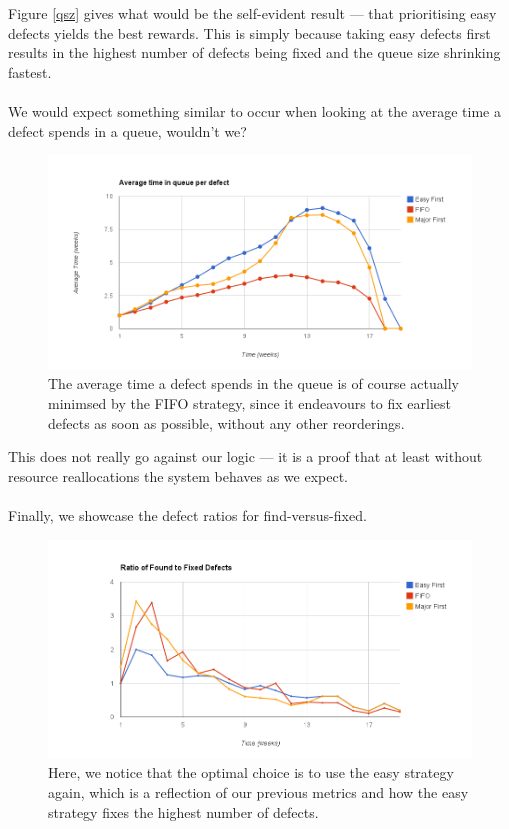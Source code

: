 Figure \ref{qsz} gives what would be the self-evident result --- that prioritising easy defects
yields the best rewards.
This is simply because taking easy defects first results in the highest number of defects being
fixed and the queue size shrinking fastest.\\
\\
We would expect something similar to occur when looking at the average time a defect spends in a
queue, wouldn't we?

\pagebreak

\begin{figure}[ht!]
	\centering
	\includegraphics[scale=0.45]{graphs/avgQueueTime.png}
	\caption{The average time a defect spends in the queue is of course actually minimsed by the FIFO
strategy, since it endeavours to fix earliest defects as soon as possible, without any other
reorderings.} 
	\label{avgqtime}
\end{figure}

This does not really go against our logic --- it is a proof that at least without resource
reallocations the system behaves as we expect.\\
\\
Finally, we showcase the defect ratios for find-versus-fixed.

\pagebreak

\begin{figure}[ht!]
	\centering
	\includegraphics[scale=0.5]{graphs/RatioFF.png}
	\caption{Here, we notice that the optimal choice is to use the easy strategy again, which is a
reflection of our previous metrics and how the easy strategy fixes the highest number of defects.} 
	\label{ratioff}
\end{figure}

